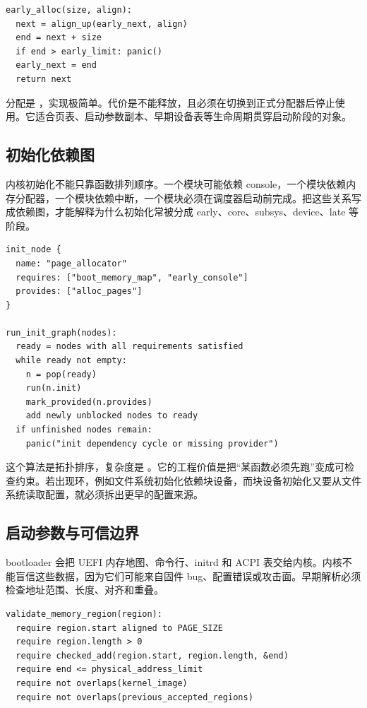 \begin{lstlisting}
early_alloc(size, align):
  next = align_up(early_next, align)
  end = next + size
  if end > early_limit: panic()
  early_next = end
  return next
\end{lstlisting}

分配是 ，实现极简单。代价是不能释放，且必须在切换到正式分配器后停止使用。它适合页表、启动参数副本、早期设备表等生命周期贯穿启动阶段的对象。

\subsection{初始化依赖图}

内核初始化不能只靠函数排列顺序。一个模块可能依赖 console，一个模块依赖内存分配器，一个模块依赖中断，一个模块必须在调度器启动前完成。把这些关系写成依赖图，才能解释为什么初始化常被分成 early、core、subsys、device、late 等阶段。

\begin{lstlisting}
init_node {
  name: "page_allocator"
  requires: ["boot_memory_map", "early_console"]
  provides: ["alloc_pages"]
}

run_init_graph(nodes):
  ready = nodes with all requirements satisfied
  while ready not empty:
    n = pop(ready)
    run(n.init)
    mark_provided(n.provides)
    add newly unblocked nodes to ready
  if unfinished nodes remain:
    panic("init dependency cycle or missing provider")
\end{lstlisting}

这个算法是拓扑排序，复杂度是 。它的工程价值是把“某函数必须先跑”变成可检查约束。若出现环，例如文件系统初始化依赖块设备，而块设备初始化又要从文件系统读取配置，就必须拆出更早的配置来源。

\subsection{启动参数与可信边界}

bootloader 会把 UEFI 内存地图、命令行、initrd 和 ACPI 表交给内核。内核不能盲信这些数据，因为它们可能来自固件 bug、配置错误或攻击面。早期解析必须检查地址范围、长度、对齐和重叠。

\begin{lstlisting}
validate_memory_region(region):
  require region.start aligned to PAGE_SIZE
  require region.length > 0
  require checked_add(region.start, region.length, &end)
  require end <= physical_address_limit
  require not overlaps(kernel_image)
  require not overlaps(previous_accepted_regions)
\end{lstlisting}

